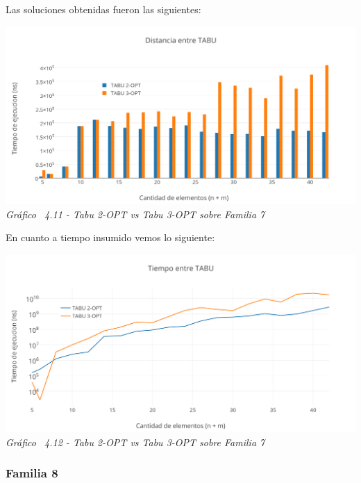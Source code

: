 Las soluciones obtenidas fueron las siguientes:

\vspace*{0.3cm} \vspace*{0.3cm}
  \begin{center}
 \includegraphics[scale=0.5]{./EJ4/comparativoanillos1.png}\\
 {            \textit{Gráfico \ 4.11 - Tabu 2-OPT vs Tabu 3-OPT sobre Familia 7}}
  \end{center}
  \vspace*{0.3cm}

En cuanto a tiempo insumido vemos lo siguiente:

\vspace*{0.3cm} \vspace*{0.3cm}
  \begin{center}
 \includegraphics[scale=0.5]{./EJ4/comparativoanillos.png}\\
 {            \textit{Gráfico \ 4.12 - Tabu 2-OPT vs Tabu 3-OPT sobre Familia 7}}
  \end{center}
  \vspace*{0.3cm}

  
  
\subsubsection*{Familia 8}

